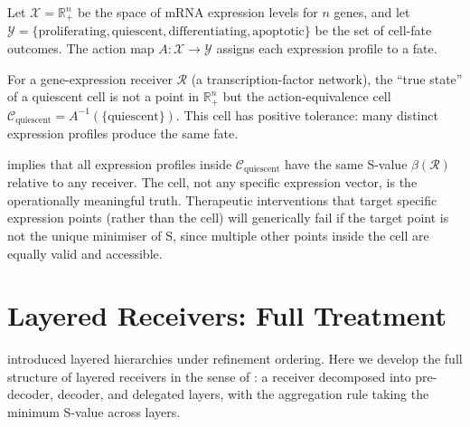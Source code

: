 \begin{example}
\label{ex:gene-expression}
Let $\mathcal{X} = \mathbb{R}_{+}^n$ be the space of mRNA expression levels
for $n$ genes, and let $\mathcal{Y} = \{\text{proliferating}, \text{quiescent},
\text{differentiating}, \text{apoptotic}\}$ be the set of cell-fate outcomes.
The action map $A : \mathcal{X} \to \mathcal{Y}$ assigns each expression
profile to a fate.

For a gene-expression receiver $\mathcal{R}$ (a transcription-factor network),
the ``true state'' of a quiescent cell is not a point in $\mathbb{R}_{+}^n$
but the action-equivalence cell $\mathcal{C}_{\text{quiescent}} = A^{-1}
(\{\text{quiescent}\})$.  This cell has positive tolerance: many distinct
expression profiles produce the same fate.

 implies that all expression profiles inside
$\mathcal{C}_{\text{quiescent}}$ have the same S-value $\beta(\mathcal{R})$
relative to any receiver.  The cell, not any specific expression vector,
is the operationally meaningful truth.  Therapeutic interventions that target
specific expression points (rather than the cell) will generically fail if the
target point is not the unique minimiser of S, since multiple other points
inside the cell are equally valid and accessible.
\end{example}

\section{Layered Receivers: Full Treatment}
\label{sec:layered-ch02}

 introduced layered hierarchies under refinement
ordering.  Here we develop the full structure of layered receivers in the
sense of : a receiver decomposed into pre-decoder,
decoder, and delegated layers, with the aggregation rule taking the minimum
S-value across layers.

